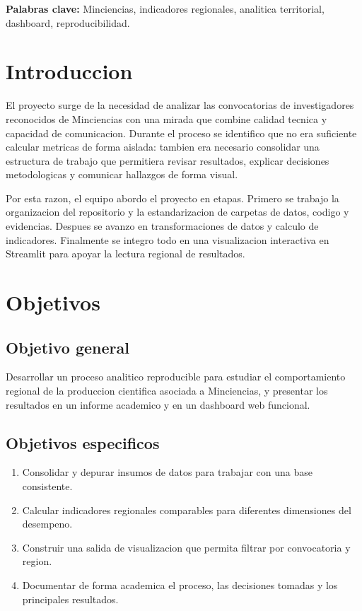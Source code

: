 \documentclass[12pt,letterpaper]{article}
\begin{document}
\textbf{Palabras clave:} Minciencias, indicadores regionales, analitica territorial, dashboard, reproducibilidad.

\section{Introduccion}

El proyecto surge de la necesidad de analizar las convocatorias de investigadores reconocidos de Minciencias con una mirada que combine calidad tecnica y capacidad de comunicacion. Durante el proceso se identifico que no era suficiente calcular metricas de forma aislada: tambien era necesario consolidar una estructura de trabajo que permitiera revisar resultados, explicar decisiones metodologicas y comunicar hallazgos de forma visual.

Por esta razon, el equipo abordo el proyecto en etapas. Primero se trabajo la organizacion del repositorio y la estandarizacion de carpetas de datos, codigo y evidencias. Despues se avanzo en transformaciones de datos y calculo de indicadores. Finalmente se integro todo en una visualizacion interactiva en Streamlit para apoyar la lectura regional de resultados.

\section{Objetivos}

\subsection{Objetivo general}

Desarrollar un proceso analitico reproducible para estudiar el comportamiento regional de la produccion cientifica asociada a Minciencias, y presentar los resultados en un informe academico y en un dashboard web funcional.

\subsection{Objetivos especificos}

\begin{enumerate}[label=\arabic*.]
  \item Consolidar y depurar insumos de datos para trabajar con una base consistente.
  \item Calcular indicadores regionales comparables para diferentes dimensiones del desempeno.
  \item Construir una salida de visualizacion que permita filtrar por convocatoria y region.
  \item Documentar de forma academica el proceso, las decisiones tomadas y los principales resultados.
\end{enumerate}
\end{document}
